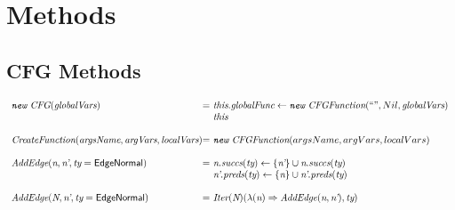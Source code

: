 \section{Methods}
\subsection{CFG Methods}
\[
\begin{array}{l@{}l@{~}l}
\emph{\TT{new}\ CFG}(\emph{globalVars})
& = & \emph{this}.\emph{globalFunc} \leftarrow \emph{\TT{new}\ CFGFunction}(``", Nil, \emph{globalVars})\\
& & \emph{this}\\
& & \\

\emph{CreateFunction}(\emph{argsName}, \emph{argVars}, \emph{localVars})
& = & \emph{\TT{new}\ CFGFunction}(argsName, argVars, localVars)\\
& & \\

\emph{AddEdge}(\emph{n}, \emph{n'}, \emph{ty} = \SF{EdgeNormal})
& = & \emph{n}.\emph{succs}(\emph{ty}) \leftarrow \{\emph{n'}\}\cup \emph{n}.\emph{succs}(\emph{ty})\\
& & \emph{n'}.\emph{preds}(\emph{ty}) \leftarrow \{\emph{n}\}\cup \emph{n'}.\emph{preds}(\emph{ty})\\
& & \\

\emph{AddEdge}(\emph{N}, \emph{n'}, \emph{ty} = \SF{EdgeNormal})
& = & \Iter(\emph{N})(\lambda(\emph{n}) \Rightarrow \emph{AddEdge}(\emph{n}, \emph{n'}), \emph{ty}) \\
\end{array}
\]

